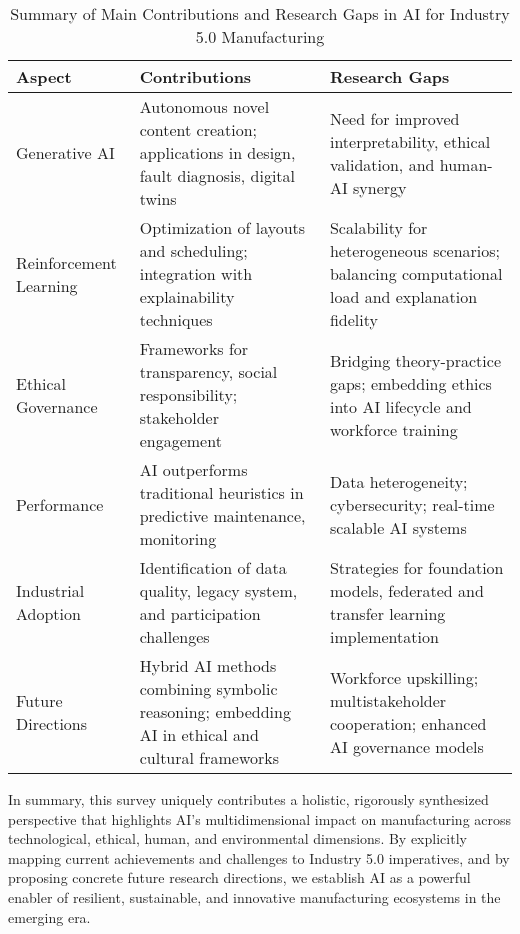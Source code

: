 \documentclass[sigconf]{acmart}
\begin{document}
\begin{table*}[htbp]
\centering
\caption{Summary of Main Contributions and Research Gaps in AI for Industry 5.0 Manufacturing}
\label{tab:contributions_gaps}
\begin{adjustbox}{max width=\textwidth}
\begin{tabular}{@{}lll@{}}
\toprule
\textbf{Aspect} & \textbf{Contributions} & \textbf{Research Gaps} \\
\midrule
Generative AI & Autonomous novel content creation; applications in design, fault diagnosis, digital twins~\cite{ref1,ref2,ref6} & Need for improved interpretability, ethical validation, and human-AI synergy~\cite{ref3,ref14} \\
Reinforcement Learning & Optimization of layouts and scheduling; integration with explainability techniques~\cite{ref5,ref30} & Scalability for heterogeneous scenarios; balancing computational load and explanation fidelity~\cite{ref35,ref36} \\
Ethical Governance & Frameworks for transparency, social responsibility; stakeholder engagement~\cite{ref25,ref38} & Bridging theory-practice gaps; embedding ethics into AI lifecycle and workforce training~\cite{ref19,ref21} \\
Performance & AI outperforms traditional heuristics in predictive maintenance, monitoring~\cite{ref4,ref24,ref32} & Data heterogeneity; cybersecurity; real-time scalable AI systems~\cite{ref29,ref35,ref39} \\
Industrial Adoption & Identification of data quality, legacy system, and participation challenges~\cite{ref3,ref7} & Strategies for foundation models, federated and transfer learning implementation~\cite{ref5,ref8} \\
Future Directions & Hybrid AI methods combining symbolic reasoning; embedding AI in ethical and cultural frameworks~\cite{ref35,ref37,ref25} & Workforce upskilling; multistakeholder cooperation; enhanced AI governance models~\cite{ref2,ref3,ref21} \\
\bottomrule
\end{tabular}
\end{adjustbox}
\end{table*}

In summary, this survey uniquely contributes a holistic, rigorously synthesized perspective that highlights AI’s multidimensional impact on manufacturing across technological, ethical, human, and environmental dimensions. By explicitly mapping current achievements and challenges to Industry 5.0 imperatives, and by proposing concrete future research directions, we establish AI as a powerful enabler of resilient, sustainable, and innovative manufacturing ecosystems in the emerging era.






\end{document}
